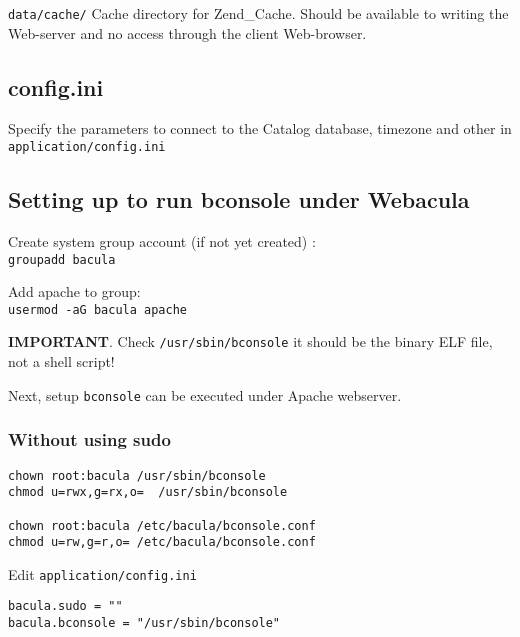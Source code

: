 \documentclass[10pt]{article}
\begin{document}
\texttt{data/cache/}  Cache directory for Zend\_Cache. Should be available to writing the Web-server and
                  no access through the client Web-browser.





\subsection{config.ini}
\label{Install:config.ini}

Specify the parameters to connect to the Catalog database, timezone and other in \texttt{application/config.ini}




\subsection{Setting up to run bconsole under Webacula}
\label{Install:Setting up to run bconsole under Webacula}

Create system group account (if not yet created) : \\
\texttt{groupadd bacula}

Add apache to group: \\
\texttt{usermod -aG bacula apache}

\textbf{IMPORTANT}. Check \texttt{/usr/sbin/bconsole} it should be the binary ELF file, not a shell script!

Next, setup \texttt{bconsole} can be executed under Apache webserver.



\subsubsection{Without using sudo}
\label{Install:Setting up to run bconsole from under Webacula:without sudo}

\begin{verbatim}
chown root:bacula /usr/sbin/bconsole
chmod u=rwx,g=rx,o=  /usr/sbin/bconsole

chown root:bacula /etc/bacula/bconsole.conf
chmod u=rw,g=r,o= /etc/bacula/bconsole.conf
\end{verbatim}

Edit \texttt{application/config.ini}
\begin{verbatim}
bacula.sudo = ""
bacula.bconsole = "/usr/sbin/bconsole"
\end{verbatim}
\end{document}

